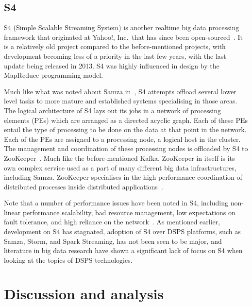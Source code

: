 

\subsection{S4} %
\label{ssub:s4}

S4 (Simple Scalable Streaming System) is another realtime big data processing framework that originated at Yahoo!, Inc.\
that has since been open-sourced~\cite{neumeyer2010s4}. It is a relatively old project compared to the before-mentioned
projects, with development becoming less of a priority in the last few years, with the last update being released in 2013.
S4 was highly influenced in design by the MapReduce programming model.

Much like what was noted about Samza in~, S4 attempts offload several lower level tasks to more
mature and established systems specialising in those areas. The logical architecture of S4 lays out its jobs in a
network of processing elements (PEs) which are arranged as a directed acyclic graph. Each of these PEs entail the type
of processing to be done on the data at that point in the network. Each of the PEs are assigned to a processing node, a
logical host in the cluster. The management and coordination of these processing nodes is offloaded by S4 to
ZooKeeper~\cite{kamburugamuve_survey_2014}. Much like the before-mentioned Kafka, ZooKeeper in itself is its own complex
service used as a part of many different big data infrastructures, including Samza. ZooKeeper specialises in the
high-performance coordination of distributed processes inside distributed applications~\cite{hunt2010zookeeper}.

Note that a number of performance issues have been noted in S4, including non-linear performance scalability, bad
resource management, low expectations on fault tolerance, and high reliance on the network~\cite{chauhan2012performance}.
As mentioned earlier, development on S4 has stagnated, adoption of S4 over DSPS platforms, such as Samza, Storm,
and Spark Streaming, has not been seen to be major, and literature in big data research have shown a significant lack of
focus on S4 when looking at the topics of DSPS technologies.




\section{Discussion and analysis} %
\label{sub:processing_conclusion}

